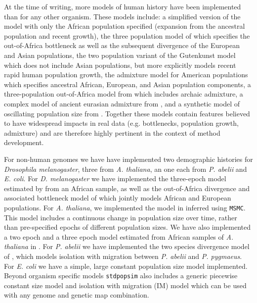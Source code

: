 \documentclass[12pt,halfline,a4paper]{ouparticle}
\newcommand{\stdpopsim}{\texttt{stdpopsim}\xspace}
\newcommand{\MSMC}{\texttt{MSMC}\xspace}
\begin{document}
At the time of writing, more models of human history have been implemented than for
any other organism. These models include: a simplified version of the \cite{tennessen2012evolution}
model with only the African population specified (expansion from the ancestral
population and recent growth), the three population model of \cite{gutenkunst2009inferring}
which specifies the out-of-Africa bottleneck as well as the subsequent divergence of
the European and Asian populations, the \cite{tennessen2012evolution} two population variant of the
Gutenkunst model which does not include Asian populations, but more explicitly models
recent rapid human population growth, the \cite{browning2018ancestry} admixture model
for American populations which specifies ancestral African, European, and Asian population
components, a three-population out-of-Africa model from \cite{ragsdale2019models}
which includes archaic admixture, a complex model of ancient eurasian admixture from \cite{kamm2019efficiently},
and a synthetic model of oscillating population size from \cite{schiffels2014inferring}.
Together these models
contain features believed to have widespread impacts in real data (e.g. bottlenecks, population growth,
admixture) and are therefore highly pertinent in the context of method development.

For non-human genomes we have have implemented two demographic histories for
\emph{Drosophila melanogaster}, three from \emph{A. thaliana}, an one each from \emph{P. abelii} and \emph{E. coli}.
For \emph{D. melanogaster} we have implemented the three-epoch model estimated by \cite{sheehan2016deep} from
an African sample, as well as the out-of-Africa divergence
and associated bottleneck model of \cite{li2006inferring} which jointly models African
and European populations. For \emph{A. thaliana}, we implemented the
model in \cite{durvasula2017african} inferred using \MSMC. This model includes
a continuous change in population size over time, rather than pre-specified epochs of different
population sizes. We have also implemented a two epoch and a three epoch model estimated from African
samples of \emph{A. thaliana} in \cite{huber2018gene}. For \emph{P. abelii} we have implemented the two 
species divergence model of \cite{locke2011comparative}, which models isolation with migration between \emph{P. abelii}
and \emph{P. pygmaeus}. For \emph{E. coli} we have a simple, large constant population size model implemented.
Beyond organism specific models \stdpopsim also includes a generic piecewise constant size model and 
isolation with migration (IM) model which can be used with any genome and genetic map combination.
\end{document}
